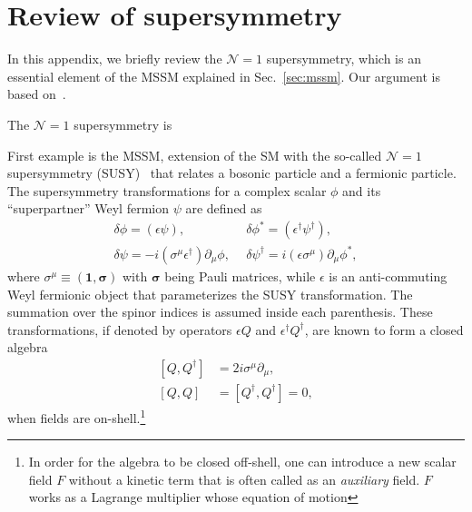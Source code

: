 \documentclass[12pt,twoside,book]{article}
\begin{document}
\section{Review of supersymmetry}
\label{sec:susy}

\vskip 0.1in


In this appendix, we briefly review the $\mathcal{N}=1$ supersymmetry,
which is an essential element of the MSSM explained in
Sec.~\ref{sec:mssm}.  Our argument is based on~\cite{Wess:320631,
Martin:1997ns}.

The $\mathcal{N}=1$ supersymmetry is

First example is the MSSM, extension of the SM with the so-called
$\mathcal{N}=1$ supersymmetry (SUSY)~\cite{Wess:320631, Martin:1997ns}
that relates a bosonic particle and a fermionic particle.  The
supersymmetry transformations for a complex scalar $\phi$ and its
``superpartner'' Weyl fermion $\psi$ are defined as
\begin{align}
 \delta \phi = \left( \epsilon \psi \right),
 ~&~
 \delta \phi^{*} = \left( \epsilon^\dagger \psi^\dagger \right),\\
 \delta \psi = -i \left(\sigma^\mu \epsilon^\dagger \right) \partial_\mu \phi,
 ~&~
 \delta \psi^\dagger = i \left(\epsilon \sigma^\mu \right) \partial_\mu \phi^{*},
\end{align}
where $\sigma^\mu \equiv (\bm{1}, \bm{\sigma})$ with $\bm{\sigma}$
being Pauli matrices, while $\epsilon$ is an anti-commuting Weyl
fermionic object that parameterizes the SUSY transformation.  The
summation over the spinor indices is assumed inside each parenthesis.
These transformations, if denoted by operators $\epsilon Q$ and
$\epsilon^\dagger Q^\dagger$, are known to form a closed algebra
\begin{align}
 \left[ Q, Q^\dagger \right] &= 2 i \sigma^\mu \partial_\mu,\\
 \left[ Q, Q \right] &= \left[ Q^\dagger, Q^\dagger \right] = 0,
\end{align}
when fields are on-shell.\footnote{
  In order for the algebra to be closed off-shell, one can introduce a new scalar field $F$ without a kinetic term that is often called as an \textit{auxiliary} field.
  $F$ works as a Lagrange multiplier whose equation of motion 
}



\end{document}
